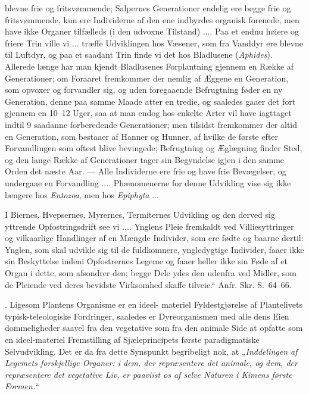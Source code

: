 \documentclass[11pt]{book}
\newcommand{\opage}[1]{\marginnote{\footnotesize\textit{[#1]}}}
\begin{document}
{blevne frie og fritsvømmende; Salpernes Generationer endelig ere begge
frie og fritsvømmende, kun ere Individerne af den ene indbyrdes
organisk forenede, men have ikke Organer tilfælleds (i den udvoxne
Tilstand) .... Paa et endnu høiere og friere Trin ville vi ... træffe
Udviklingen hos Væsener, som fra Vanddyr ere blevne til Luftdyr, og
paa et saadant Trin finde vi det hos Bladlusene (\textit{Aphides}).
Allerede længe har man kjendt Bladlusenes Forplantning gjennem en
Række af Generationer; om Foraaret fremkommer der nemlig af Æggene en
Generation, som opvoxer og forvandler sig, og uden foregaaende
Befrugtning føder en ny Generation, denne paa samme Maade atter en
tredie, og saaledes gaaer det fort gjennem en 10--12 Uger, saa at man
endog hos enkelte Arter vil have iagttaget indtil 9 saadanne
forberedende Generationer; men tilsidst fremkommer der altid en
Generation, som bestaaer af Hanner og Hunner, af hvilke de første
efter Forvandlingen som oftest blive bevingede; Befrugtning og
Æglægning finder Sted, og den lange Række af Generationer tager sin
Begyndelse igjen i den samme Orden det næste Aar. --- Alle
Individerne ere frie og have frie Bevægelser, og undergaae en
Forvandling .... Phænomenerne for denne Udvikling vise sig ikke
længere hos \textit{Entozoa}, men hos \textit{Epiphyta} ...

I Biernes, Hvepsernes, Myrernes, Termiternes Udvikling og den derved
sig yttrende Opfostringsdrift see vi .... Ynglens Pleie fremkaldt ved
Villiesyttringer og vilkaarlige Handlinger af en Mængde Individer, som
ere fødte og baarne dertil: Ynglen, som skal udvikle sig til de
fuldkomnere, yngledygtige Individer, faaer ikke sin Beskyttelse
indeni Opfostrernes Legeme og faaer heller ikke sin Føde af et Organ i
dette, som afsondrer den; begge Dele ydes den udenfra ved Midler, som
de Pleiende ved deres bevidste Virksomhed skaffe tilveie.“ Anfr. Skr.
S.~64--66.
}. Ligesom Plantens Organisme er en ideel-%
\opage{361} \setcounter{footnote}{0}%
materiel Fyldestgjørelse af Plantelivets typisk-teleologiske
Fordringer, saaledes er Dyreorganismen med alle dens Eien\-%
\opage{362} \setcounter{footnote}{0}%
dommeligheder saavel fra den vegetative som fra den animale Side at
opfatte som en ideel-materiel Fremstilling af Sjæleprincipets første
paradigmatiske Selvudvikling. Det er da fra dette Synspunkt
begribeligt nok, at „\emph{Inddelingen af Legemets forskjellige
Organer: i dem, der repræsentere det animale, og dem, der
repræsentere det vegetative Liv, er paaviist os af selve Naturen i
Kimens første Formen.}“
\end{document}
